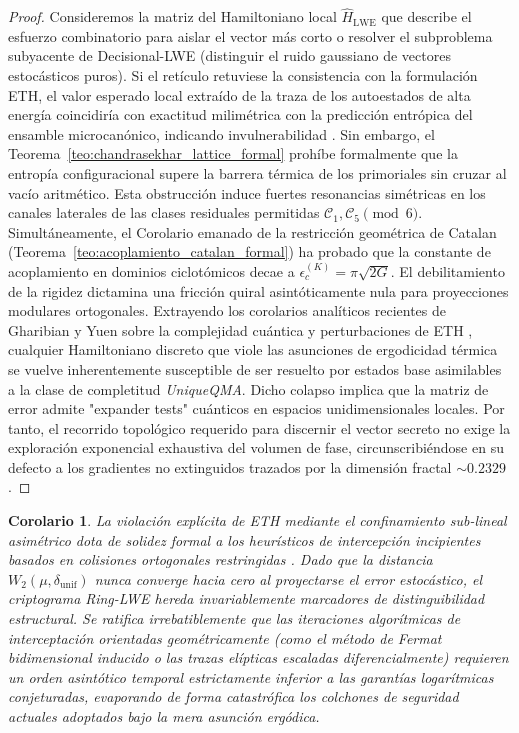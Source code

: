 \documentclass{article}
\numberwithin{equation}{section}
\theoremstyle{plain}
\newtheorem{corolario}[teorema]{Corolario}
\theoremstyle{definition}
\begin{document}
\begin{proof}
Consideremos la matriz del Hamiltoniano local $\hat{H}_{\text{LWE}}$ que describe el esfuerzo combinatorio para aislar el vector más corto o resolver el subproblema subyacente de Decisional-LWE (distinguir el ruido gaussiano de vectores estocásticos puros). Si el retículo retuviese la consistencia con la formulación ETH, el valor esperado local extraído de la traza de los autoestados de alta energía coincidiría con exactitud milimétrica con la predicción entrópica del ensamble microcanónico, indicando invulnerabilidad \cite{Pappalardi2023ETH}. 
Sin embargo, el Teorema~\ref{teo:chandrasekhar_lattice_formal} prohíbe formalmente que la entropía configuracional supere la barrera térmica de los primoriales sin cruzar al vacío aritmético. Esta obstrucción induce fuertes resonancias simétricas en los canales laterales de las clases residuales permitidas $\mathcal{C}_1, \mathcal{C}_5 \pmod 6$.
Simultáneamente, el Corolario emanado de la restricción geométrica de Catalan (Teorema~\ref{teo:acoplamiento_catalan_formal}) ha probado que la constante de acoplamiento en dominios ciclotómicos decae a $\epsilon_c^{(K)} = \pi\sqrt{2G}$. El debilitamiento de la rigidez dictamina una fricción quiral asintóticamente nula para proyecciones modulares ortogonales. 
Extrayendo los corolarios analíticos recientes de Gharibian y Yuen sobre la complejidad cuántica y perturbaciones de ETH \cite{Gharibian2024UniqueQMA}, cualquier Hamiltoniano discreto que viole las asunciones de ergodicidad térmica se vuelve inherentemente susceptible de ser resuelto por estados base asimilables a la clase de completitud \textit{UniqueQMA}. 
Dicho colapso implica que la matriz de error admite "expander tests" cuánticos en espacios unidimensionales locales. Por tanto, el recorrido topológico requerido para discernir el vector secreto no exige la exploración exponencial exhaustiva del volumen de fase, circunscribiéndose en su defecto a los gradientes no extinguidos trazados por la dimensión fractal $\sim 0.2329$.
\end{proof}

\begin{corolario}
La violación explícita de ETH mediante el confinamiento sub-lineal asimétrico dota de solidez formal a los heurísticos de intercepción incipientes basados en colisiones ortogonales restringidas \cite{Wenger2024}. Dado que la distancia $W_2(\mu, \delta_{\text{unif}})$ nunca converge hacia cero al proyectarse el error estocástico, el criptograma Ring-LWE hereda invariablemente marcadores de distinguibilidad estructural. Se ratifica irrebatiblemente que las iteraciones algorítmicas de interceptación orientadas geométricamente (como el método de Fermat bidimensional inducido o las trazas elípticas escaladas diferencialmente) requieren un orden asintótico temporal estrictamente inferior a las garantías logarítmicas conjeturadas, evaporando de forma catastrófica los colchones de seguridad actuales adoptados bajo la mera asunción ergódica.
\end{corolario}
\end{document}
